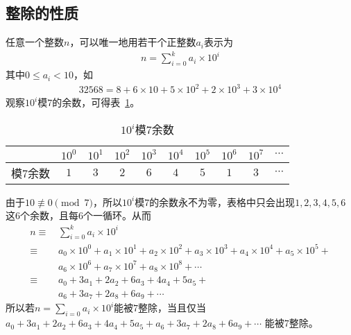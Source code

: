 \subsection{整除的性质}
\begin{example}[被$7$整除]\label{ex:divided-by-7}
  任意一个整数$n$，可以唯一地用若干个正整数$a_i$表示为
  \begin{align*}
    n=\sum_{i=0}^{k} a_i\times 10^i
  \end{align*}
  其中$0\le a_i<10$，如
  \begin{align*}
    32568 = 8 + 6\times 10 + 5\times 10^2 + 2\times 10^3 + 3\times10^4
  \end{align*}
  观察$10^i$模$7$的余数，可得表~\ref{tab:10^i-modular-7}。

  \begin{table}[htbp]
    \centering
    \caption{$10^i$模$7$余数}
    \label{tab:10^i-modular-7}
    \begin{tabular}{cccccccccc}
      \toprule
                & $10^0$ & $10^1$ & $10^2$ & $10^3$ & $10^4$ & $10^5$ & $10^6$ & $10^7$ & $\cdots$ \\ \midrule
      模$7$余数 & $1$    & $3$    & $2$    & $6$    & $4$    & $5$    & $1$    & $3$    & $\cdots$ \\ 
      \bottomrule
    \end{tabular}
  \end{table}

  由于$10\not\equiv0\pmod7$，所以$10^i$模$7$的余数永不为零，表格中只会出现$1,2,3,4,5,6$这$6$个余数，且每$6$个一循环。从而
  \begin{align*}
    n\equiv\,&\sum_{i=0}^{k} a_i\times10^i\tag*{$\pmod7$}\\
     \equiv\,& a_0\times10^0 + a_1\times10^1 + a_2\times10^2 + a_3\times10^3 + a_4\times10^4 + a_5\times10^5 +\\
             & a_6\times10^6 + a_7\times10^7 + a_8\times10^8 + \cdots \tag*{$\pmod7$}\\
     \equiv\,& a_0 + 3a_1 + 2a_2 + 6a_3 + 4a_4 + 5a_5 +\\
             & a_6 + 3a_7 + 2a_8 + 6a_9 + \cdots\tag*{$\pmod7$}
  \end{align*}
  所以若$n=\sum\limits_{i=0}a_i\times10^i$能被$7$整除，当且仅当
  $a_0 + 3a_1 + 2a_2 + 6a_3 + 4a_4 + 5a_5 + a_6 + 3a_7 + 2a_8 + 6a_9 + \cdots$
  能被$7$整除。
\end{example}


